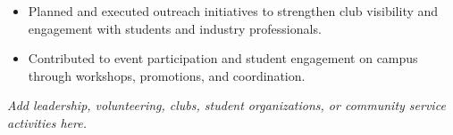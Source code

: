 \begin{itemize}
  \item Planned and executed outreach initiatives to strengthen club visibility and engagement with students and industry professionals.
  \item Contributed to event participation and student engagement on campus through workshops, promotions, and coordination.
\end{itemize}

\vspace{0.15em}
\textit{Add leadership, volunteering, clubs, student organizations, or community service activities here.}
